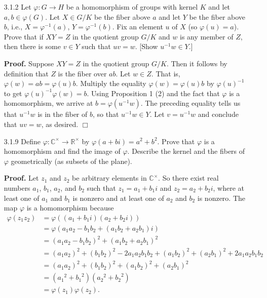 \documentclass[9pt]{article}
\newcommand{\qed}{\hfill \ensuremath{\Box}}
\newcommand{\C}{\mathbb{C}}
\newcommand{\R}{\mathbb{R}}
\begin{document}
\begin{enumerate}
   \item[3.1.2]   Let $\varphi : G \rightarrow H$ be a homomorphism of groups 
                  with kernel $K$ and let $a, b \in \varphi(G)$. Let $X \in G/K$ 
                  be the  fiber above $a$ and let $Y$ be the fiber above $b$, 
                  i.e., $X = \varphi^{-1}(a)$, $Y = \varphi^{-1}(b)$. Fix an 
                  element $u$ of $X$ (so $\varphi(u) = a$). Prove that if
                  $XY = Z$ in the quotient group $G/K$ and $w$ is any member of 
                  $Z$, then there is some $v \in Y$ such that $uv = w$.
                  [Show $u^{-1}w \in Y$.]
                  
      \textbf{Proof.} Suppose $XY = Z$ in the quotient group $G/K$. Then it
      follows by definition that $Z$ is the fiber over $ab$. Let $w \in Z$.
      That is, $\varphi(w) = ab = \varphi(u)b$. Multiply the equality
      $\varphi(w) = \varphi(u)b$ by $\varphi(u)^{-1}$ to get
      $\varphi(u)^{-1}\varphi(w) = b$. Using Proposition 1 (2) and the fact that
      $\varphi$ is a homomorphism, we arrive at $b = \varphi(u^{-1}w)$. The
      preceding equality tells us that $u^{-1}w$ is in the fiber of $b$, so that
      $u^{-1}w \in Y$. Let $v = u^{-1}w$ and conclude that $uv = w$, as desired.
      \qed
   \item[3.1.9]   Define $\varphi : \C^\times \rightarrow \R^\times$ by
                  $\varphi(a + bi) = a^2 + b^2$. Prove that $\varphi$ is a
                  homomorphism and find the image of $\varphi$. Describe the
                  kernel and the fibers of $\varphi$ geometrically (as subsets
                  of the plane).
                  
      \textbf{Proof.} Let $z_1$ and $z_2$ be arbitrary elements in $\C^\times$.
      So there exist real numbers $a_1$, $b_1$, $a_2$, and $b_2$ such that
      $z_1 = a_1 + b_1i$ and $z_2 = a_2 + b_2i$, where at least one of $a_1$ and
      $b_1$ is nonzero and at least one of $a_2$ and $b_2$ is nonzero. The map
      $\varphi$ is a homomorphism because
      \begin{align*}
         \varphi(z_1z_2) &= \varphi((a_1+b_1i)(a_2+b_2i)) \\
            &= \varphi(a_1a_2 - b_1b_2 + (a_1b_2 + a_2b_1)i) \\
            &= (a_1a_2 - b_1b_2)^2 + (a_1b_2 + a_2b_1)^2 \\
            &= (a_1a_2)^2 + (b_1b_2)^2 - 2a_1a_2b_1b_2 + (a_1b_2)^2 +
               (a_2b_1)^2 + 2a_1a_2b_1b_2 \\
            &= (a_1a_2)^2 + (b_1b_2)^2  + (a_1b_2)^2 + (a_2b_1)^2 \\
            &= ({a_1}^2 + {b_1}^2)({a_2}^2 + {b_2}^2) \\
            &= \varphi(z_1)\varphi(z_2).
      \end{align*}
      

\end{enumerate}
\end{document}
